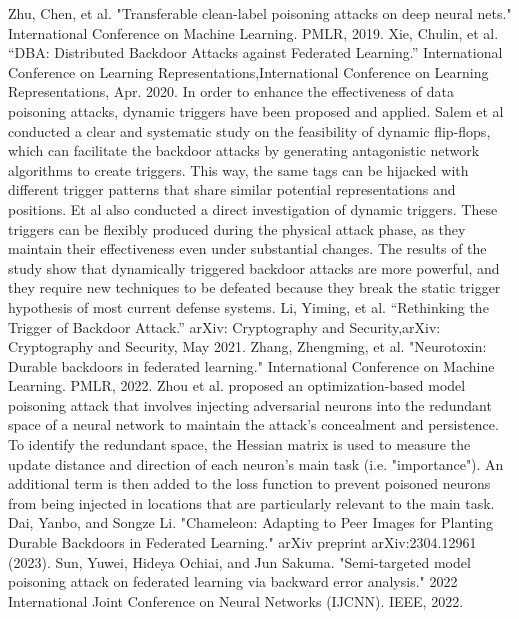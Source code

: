 \documentclass[conference]{IEEEtran}
\begin{document}
\begin{thebibliography}{00}
     Zhu, Chen, et al. "Transferable clean-label poisoning attacks on deep neural nets." International Conference on Machine Learning. PMLR, 2019.
     Xie, Chulin, et al. “DBA: Distributed Backdoor Attacks against Federated Learning.” International Conference on Learning Representations,International Conference on Learning Representations, Apr. 2020.
     In order to enhance the effectiveness of data poisoning attacks, dynamic triggers have been proposed and applied. Salem et al conducted a clear and systematic study on the feasibility of dynamic flip-flops, which can facilitate the backdoor attacks by generating antagonistic network algorithms to create triggers. This way, the same tags can be hijacked with different trigger patterns that share similar potential representations and positions. Et al also conducted a direct investigation of dynamic triggers. These triggers can be flexibly produced during the physical attack phase, as they maintain their effectiveness even under substantial changes. The results of the study show that dynamically triggered backdoor attacks are more powerful, and they require new techniques to be defeated because they break the static trigger hypothesis of most current defense systems.
     Li, Yiming, et al. “Rethinking the Trigger of Backdoor Attack.” arXiv: Cryptography and Security,arXiv: Cryptography and Security, May 2021.
     Zhang, Zhengming, et al. "Neurotoxin: Durable backdoors in federated learning." International Conference on Machine Learning. PMLR, 2022.
     Zhou et al. proposed an optimization-based model poisoning attack that involves injecting adversarial neurons into the redundant space of a neural network to maintain the attack's concealment and persistence. To identify the redundant space, the Hessian matrix is used to measure the update distance and direction of each neuron's main task (i.e. "importance"). An additional term is then added to the loss function to prevent poisoned neurons from being injected in locations that are particularly relevant to the main task.
     Dai, Yanbo, and Songze Li. "Chameleon: Adapting to Peer Images for Planting Durable Backdoors in Federated Learning." arXiv preprint arXiv:2304.12961 (2023).
     Sun, Yuwei, Hideya Ochiai, and Jun Sakuma. "Semi-targeted model poisoning attack on federated learning via backward error analysis." 2022 International Joint Conference on Neural Networks (IJCNN). IEEE, 2022.








\end{thebibliography}
\end{document}
